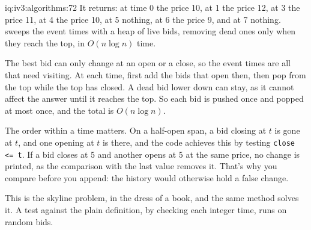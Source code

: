 \begin{solution}{iq:iv3:algorithms:72}
It returns: at time 0 the price 10, at 1 the price 12, at 3 the price 11, at 4 the price 10, at 5 nothing, at 6 the price 9, and at 7 nothing.  sweeps the event times with a heap of live bids, removing dead ones only when they reach the top, in $O(n \log n)$ time.
\enlargethispage{-3\baselineskip}%
\label{lst:iv3:al:bidhistory}

The best bid can only change at an open or a close, so the event times are all that need visiting. At each time, first add the bids that open then, then pop from the top while the top has closed. A dead bid lower down can stay, as it cannot affect the answer until it reaches the top. So each bid is pushed once and popped at most once, and the total is $O(n \log n)$.

The order within a time matters. On a half-open span, a bid closing at $t$ is gone at $t$, and one opening at $t$ is there, and the code achieves this by testing \texttt{close <= t}. If a bid closes at 5 and another opens at 5 at the same price, no change is printed, as the comparison with the last value removes it. That's why you compare before you append: the history would otherwise hold a false change.

This is the skyline problem, in the dress of a book, and the same method solves it. A test against the plain definition, by checking each integer time, runs on random bids.

\end{solution}

